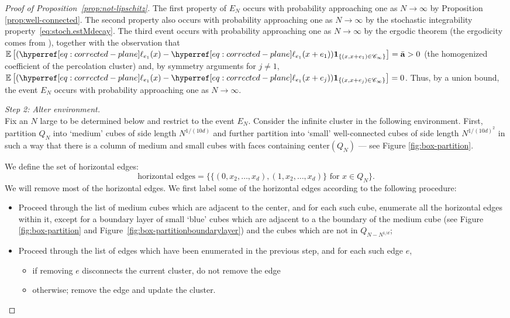 \documentclass[12pt]{amsart}
\numberwithin{equation}{section}
\begin{document}
\begin{proof}[Proof of Proposition~\ref{prop:not-lipschitz}]
		The first property of $E_N$ occurs with probability approaching one as $N \to \infty$ by Proposition \ref{prop:well-connected}. The second property also occurs with probability approaching one as $N \to \infty$ by the stochastic integrability property~\eqref{eq:stoch.estMdecay}. The third event occurs with probability approaching one as $N \to \infty$ by the ergodic theorem (the ergodicity comes from \cite[Theorem 3.2]{berger-rw-percolation}), together with the observation that $\E \left[ (\ellp{e_1}(x) - \ellp{e_1}(x+e_1)) \mathbf{1}_{\{ (x,x+e_1) \in \mathscr{C}_{\infty}\}} \right] = \bar{\mathbf{a}} > 0$ (the homogenized coefficient of the percolation cluster) and, by symmetry arguments for $j \neq 1$, $\E \left[ (\ellp{e_1}(x) - \ellp{e_1}(x+e_j)) \mathbf{1}_{\{ (x,x+e_j) \in \mathscr{C}_{\infty}\}} \right] = 0$.
		Thus, by a union bound, the event $E_N$ occurs with probability approaching one as $N \to \infty$. 
		\medskip 
		
		{\it Step 2: Alter environment.} \\
		Fix an $N$ large to be determined below and restrict to the event $E_N$. Consider the infinite cluster
		in the following environment. First, partition $Q_N$ into `medium' cubes of side length $N^{1/(10 d)}$ and further partition into `small' well-connected cubes of side length $N^{1/(10d)^2}$ in such a way that there is a column of medium and small cubes with faces containing $\mbox{center}(Q_N)$
		--- see Figure \ref{fig:box-partition}.  
		
		
		
		We define the set of horizontal edges: 
		\[
		\mbox{horizontal edges} = \{   \{ (0, x_2, \ldots, x_d) , (1, x_2, \ldots, x_d) \} \mbox{ for $x \in Q_N$} \}.
		\]
		We will remove most of the horizontal edges. We first label some of the horizontal edges according to the following procedure: 
		\begin{itemize}
			\item Proceed through the list of medium cubes which are adjacent to the center, and for each such cube, enumerate all the horizontal edges within it, except for a boundary layer of small `blue' cubes which are adjacent to a the boundary of the medium cube (see Figure \ref{fig:box-partition} and Figure~\ref{fig:box-partitionboundarylayer}) and the cubes which are not in $Q_{N - N^{1/d}}$;
			\item Proceed through the list of edges which have been enumerated in the previous step, and for each such edge $e$,
			\begin{itemize}
				\item if removing $e$ disconnects the current cluster, do not remove the edge
				\item otherwise; remove the edge and update the cluster. 
			\end{itemize}
		\end{itemize}
		

\end{proof}
\end{document}
